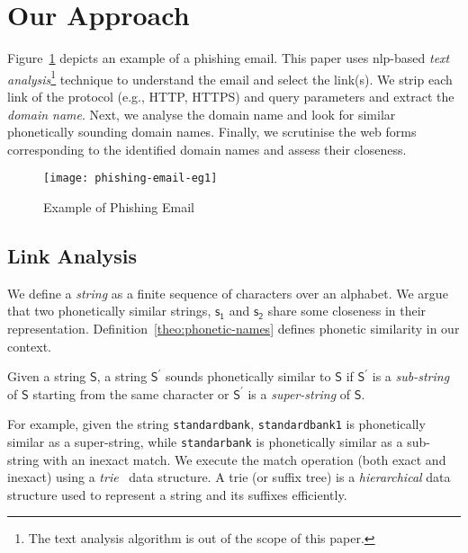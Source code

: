 \section{Our Approach} %
\label{sec:approach}

Figure~\ref{fig:phishing-email} depicts an example of a phishing email. This paper uses \gls{nlp}-based \emph{text analysis}\footnote{The text analysis algorithm is out of the scope of this paper.}  technique to understand the email and select the link(s). We strip each link of the protocol (e.g., HTTP, HTTPS) and query parameters and extract the \emph{domain name}. Next, we analyse the domain name and look for similar phonetically sounding domain names. Finally, we scrutinise the web forms corresponding to the identified domain names and assess their closeness.

\begin{figure}[hp!]
  \begin{center}
    \texttt{[image: phishing-email-eg1]}
  \end{center}
  \caption{Example of Phishing Email}\label{fig:phishing-email}
\end{figure}


\subsection{Link Analysis} %
\label{sub:approach-link-analysis}

We define a \emph{string} as a finite sequence of characters over an alphabet. We argue that two phonetically similar strings, $\mathsf{s_1}$ and $\mathsf{s_2}$ share some closeness in their representation. Definition~\ref{theo:phonetic-names} defines phonetic similarity in our context.  

\begin{definition}
  \label{theo:phonetic-names}
  Given a string $\mathsf{S}$, a string $\mathsf{S^\prime}$ sounds phonetically similar to $\mathsf{S}$ if  $\mathsf{S^\prime}$ is a \emph{sub-string} of $\mathsf{S}$ starting from the same character or $\mathsf{S^\prime}$ is a \emph{super-string} of $\mathsf{S}$.  
\end{definition}

For example, given the string {\texttt{standardbank}}, {\texttt{standardbank1}} is phonetically similar as a super-string, while {\texttt{standarbank}} is phonetically similar as a sub-string with an inexact match. We execute the match operation (both exact and inexact) using  a \emph{trie}~\cite{leis-kemper-neumann:2013,morrison:1968,gusfield:1997,ukkonen:1995} data structure. A trie (or suffix tree) is a \emph{hierarchical} data structure used to represent a string and its suffixes efficiently.

